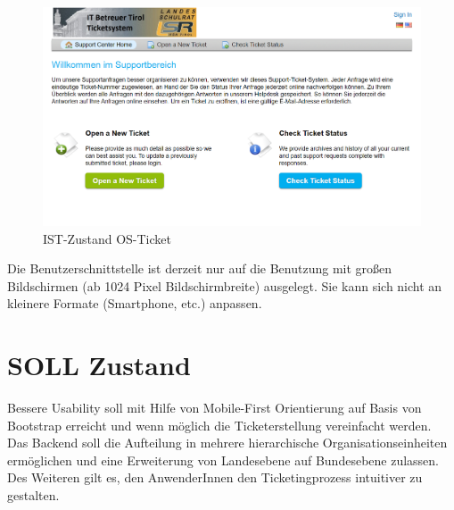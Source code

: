 \begin{figure}[h]
	\centering
	\includegraphics[scale=0.725]{figures/Ist_Login.png}
	\caption{IST-Zustand OS-Ticket}
	\label{Abb_IST-Zustand}
\end{figure}
\noindent Die Benutzerschnittstelle ist derzeit nur auf die Benutzung mit großen Bildschirmen (ab 1024 Pixel Bildschirmbreite) ausgelegt. Sie kann sich nicht an kleinere Formate (Smartphone, etc.) anpassen.

\section{SOLL Zustand}
Bessere Usability soll mit Hilfe von Mobile-First Orientierung auf Basis von Bootstrap erreicht und wenn möglich die Ticketerstellung vereinfacht werden.
\\
Das Backend soll die Aufteilung in mehrere hierarchische Organisationseinheiten ermöglichen und eine Erweiterung von Landesebene auf Bundesebene zulassen. Des Weiteren gilt es, den AnwenderInnen den Ticketingprozess intuitiver zu gestalten.

